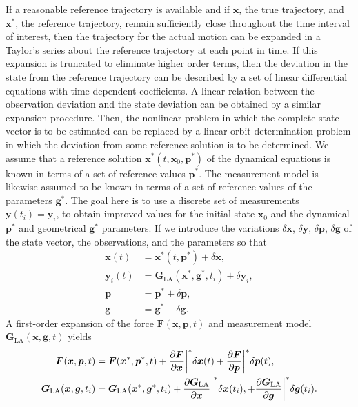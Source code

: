 \documentclass[pdflatex,sn-mathphys-num]{sn-jnl}%
\theoremstyle{thmstyleone}%
\theoremstyle{thmstyletwo}%
\theoremstyle{thmstylethree}%
\renewcommand{\vec}[1]{\boldsymbol{#1}}
\begin{document}
If a reasonable reference trajectory is available and if $\vec{x}$, the true trajectory, and $\vec{x}^*$,
the reference trajectory, remain sufficiently close throughout the time interval of interest, then the trajectory for the actual motion can be expanded in a Taylor's series about the reference trajectory at each point in time. If this expansion is truncated to eliminate higher order terms, then the deviation in the state from the reference trajectory can be described by a set of linear differential equations with time dependent coefficients. A linear relation between the observation deviation and the state deviation can be obtained by a similar expansion procedure. Then, the nonlinear problem in which the complete state vector is to be estimated can be replaced by a linear orbit determination problem in which the deviation from some reference solution is to be determined.
We assume that a reference solution $\vec{x}^* (t, \vec{x}_0 , \vec{p}^* )$ of the dynamical equations is known in terms of a set of reference values $\vec{p}^*$. The measurement model is likewise assumed to be known in terms of a set of reference values of the parameters $\vec{g}^*$. 
The goal here is to use a discrete set of measurements ${\vec{y}(t_i) = \vec{y}_i}$, to obtain improved values for the initial state $\vec{x}_0$ and the dynamical $\vec{p}^*$ and geometrical $\vec{g}^*$ parameters.
%
If we introduce the variations \( \delta \vec{x} \), \( \delta \vec{y} \), \( \delta \vec{p} \), \( \delta \vec{g} \) of the state vector, the observations, and the parameters so that
\begin{align}
	\vec{x}(t) &= \vec{x}^*(t, \vec{p}^*) + \delta \vec{x}, \\
	\vec{y}_i(t) &= \vec{G}_{\mathrm{LA}}(\vec{x}^*, \vec{g}^*, t_i) + \delta \vec{y}_i, \\
	\vec{p} &= \vec{p}^* + \delta \vec{p}, \\
	\vec{g} &= \vec{g}^* + \delta \vec{g}.
\end{align}
A first-order expansion of the force \( \vec{F}(\vec{x}, \vec{p}, t ) \) and measurement model \( \vec{G}_{\mathrm{LA}}(\vec{x}, \vec{g}, t ) \) yields
\begin{align}
	\vec{F}(\vec{x}, \vec{p}, t ) &=  \vec{F}(\vec{x}^*, \vec{p}^*, t )
	+ \pdv{ \vec{F}}{ \vec{x}} \bigg|^* \delta \vec{x}(t) 
	+\pdv{ \vec{F}}{ \vec{p}} \bigg|^* \delta \vec{p}(t), \\
	\vec{G}_{\mathrm{LA}}(\vec{x}, \vec{g}, t_i ) &=  \vec{G}_{\mathrm{LA}}(\vec{x}^*, \vec{g}^*, t_i )
	+ \pdv{ \vec{G}_{\mathrm{LA}}}{ \vec{x}} \bigg|^* \delta \vec{x}(t_i),
	+\pdv{ \vec{G}_{\mathrm{LA}}}{ \vec{g}} \bigg|^* \delta \vec{g}(t_i).
\end{align}
\end{document}

